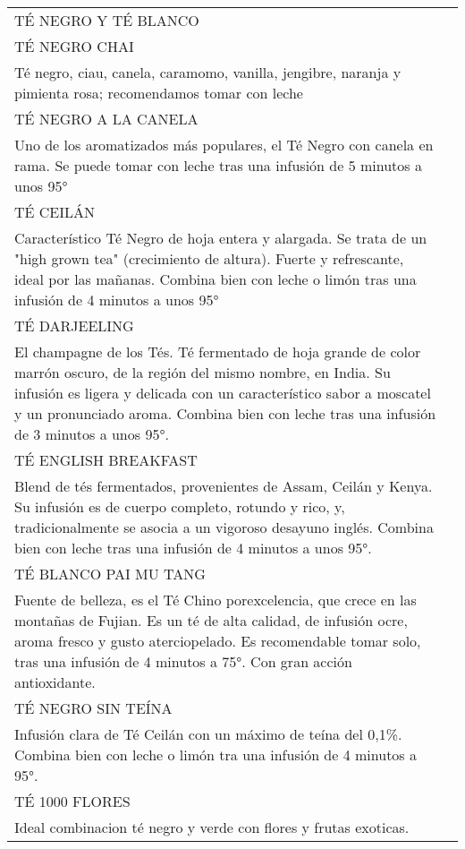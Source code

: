 \documentclass[12pt]{article}
\makeatletter
\newcommand*\ColText[1]{\textcolor{Goldenrod3}{#1}}
\newenvironment{Group}[1]
{\noindent\begin{tabular*}{\textwidth}{@{}p{1\linewidth}@{\extracolsep{\fill}}r@{}}
{\fontsize{24}{29}\selectfont\ColText{#1}}
              \\[0.8em]}
              {
\end{tabular*}}
\newcommand*\Entry[1]{%
    \sffamily#1}
\newcommand*\Expl[1]{%
    \hspace*{1em}\footnotesize #1}
\makeatother
\begin{document}
    \vfill
    \begin{Group}{TÉ NEGRO Y TÉ BLANCO}
        \Entry{TÉ NEGRO CHAI} \\
        \Expl{Té negro, ciau, canela, caramomo, vanilla, jengibre, naranja y pimienta rosa; recomendamos tomar con leche} \\
        \Entry{TÉ NEGRO A LA CANELA} \\
        \Expl{Uno de los aromatizados más populares, el Té Negro con canela en rama. Se puede tomar con leche tras una infusión de 5 minutos a unos 95°} \\
        \Entry{TÉ CEILÁN} \\
        \Expl{Característico Té Negro de hoja entera y alargada. Se trata de un "high grown tea" (crecimiento de altura). Fuerte y refrescante, ideal por las mañanas. Combina bien con leche o limón tras una infusión de 4 minutos a unos 95°} \\
        \Entry{TÉ DARJEELING} \\
        \Expl{El champagne de los Tés. Té fermentado de hoja grande de color marrón oscuro, de la región del mismo nombre, en India. Su infusión es ligera y delicada con un característico sabor a moscatel y un pronunciado aroma. Combina bien con leche tras una infusión de 3 minutos a unos 95°. } \\
        \Entry{TÉ ENGLISH BREAKFAST} \\
        \Expl{Blend de tés fermentados, provenientes de Assam, Ceilán y Kenya. Su infusión es de cuerpo completo, rotundo y rico, y, tradicionalmente se asocia a un vigoroso desayuno inglés. Combina bien con leche tras una infusión de 4 minutos a unos 95°.} \\
        \Entry{TÉ BLANCO PAI MU TANG} \\
        \Expl{Fuente de belleza, es el Té Chino porexcelencia, que crece en las montañas de Fujian. Es un té de alta calidad, de infusión ocre, aroma fresco y gusto aterciopelado. Es recomendable tomar solo, tras una infusión de 4 minutos a 75°. Con gran acción antioxidante.} \\
        \Entry{TÉ NEGRO SIN TEÍNA} \\
        \Expl{Infusión clara de Té Ceilán con un máximo de teína del 0,1\%. Combina bien con leche o limón tra una infusión de 4 minutos a 95°.} \\
        \Entry{TÉ 1000 FLORES} \\
        \Expl{Ideal combinacion té negro y verde con flores y frutas exoticas.} \\

\end{Group}
\end{document}

